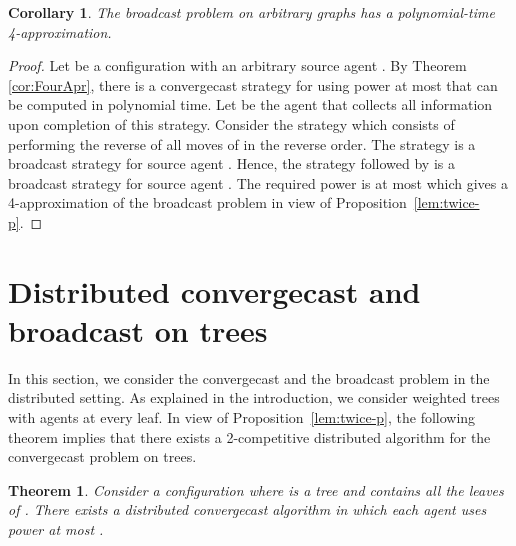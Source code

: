 \documentclass{article}
\newtheorem{theorem}{Theorem}
\newtheorem{corollary}{Corollary}
\newcommand\ccast{convergecast\xspace}
\newcommand\Dccast{Distributed convergecast\xspace}
\begin{document}
\begin{corollary}
The broadcast problem on arbitrary graphs has a polynomial-time 4-approximation.
\end{corollary}

\begin{proof}
Let  be a configuration with an arbitrary source agent . By Theorem \ref{cor:FourApr}, there is a convergecast strategy  for  using power at most  that can be computed in polynomial time. Let  be the agent that collects all information upon completion of this strategy. Consider the strategy  which consists of performing the reverse of all moves of  in the reverse order. The strategy  is a broadcast strategy for source agent . Hence, the strategy  followed by  is a broadcast strategy for source agent . The required power is at most  which gives a 4-approximation of the broadcast problem in view of Proposition~\ref{lem:twice-p}.
\end{proof}

\section{{\Dccast} and broadcast on trees}\label{s:online}

In this section, we consider the convergecast and the broadcast problem in the distributed setting. 
As explained in the introduction, we consider weighted trees with agents at every leaf. In view of Proposition~\ref{lem:twice-p}, the following theorem implies that there exists a 2-competitive distributed algorithm for the {\ccast} problem on trees.

\begin{theorem}\label{thm:FourComp}
Consider a configuration  where  is a tree and  contains all the leaves of . There exists a distributed {\ccast} algorithm in which each agent uses power at most .
\end{theorem}
\end{document}
